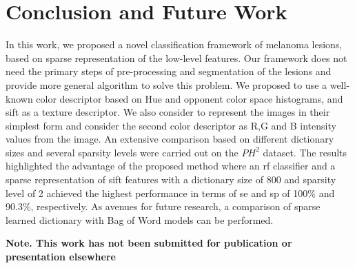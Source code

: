 \section{Conclusion and Future Work}
\label{sec:con}
In this work, we proposed a novel classification framework of melanoma lesions, based on sparse representation of the low-level features. 
Our framework does not need the primary steps of pre-processing and segmentation of the lesions and provide more general algorithm to solve this problem. 
We proposed to use a well-known color descriptor based on Hue and opponent color space histograms, and \ac{sift} as a texture descriptor. We also consider to represent the images in their simplest form and consider the second color descriptor as R,G and B intensity values from the image.
An extensive comparison based on different dictionary sizes and several sparsity levels were carried out on the $PH^{2}$ dataset. 
The results highlighted the advantage of the proposed method where an \ac{rf} classifier and a sparse representation of \ac{sift} features with a dictionary size of 800 and sparsity level of 2 achieved the highest performance in terms of \ac{se} and \ac{sp} of 100\% and 90.3\%, respectively.
As avenues for future research, a comparison of sparse learned dictionary with Bag of Word models can be performed.


\textbf{Note. This work has not been submitted for publication or presentation elsewhere}

